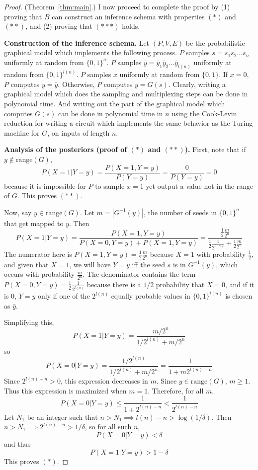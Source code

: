 \documentclass{article}
\theoremstyle{definition}
\theoremstyle{remark}
\begin{document}
\begin{proof}{(Theorem~\ref{thm:main}.)}
I now proceed to complete the proof by (1) proving that $B$ can construct an inference schema with properties $(*)$ and $(**)$, and (2) proving that $(***)$ holds.

\medskip
\noindent \textbf{Construction of the inference schema.}
Let $(P, V, E)$ be the probabilistic graphical model which implements the following process.
$P$ samples $s = s_1 s_2 \dots s_n$ uniformly at random from $\{0, 1\}^n$.
$P$ samples $\bar{y} = \bar{y}_1 \bar{y}_2 \dots \bar{y}_{l(n)}$ uniformly at random from $\{0, 1\}^{l(n)}$.
$P$ samples $x$ uniformly at random from $\{0, 1\}$.
If $x = 0$, $P$ computes $y = \bar{y}$.
Otherwise, $P$ computes $y = G(s)$.
Clearly, writing a graphical model which does the sampling and multiplexing steps can be done in polynomial time.
And writing out the part of the graphical model which computes $G(s)$ can be done in polynomial time in $n$ using the Cook-Levin reduction for writing a circuit which implements the same behavior as the Turing machine for $G$, on inputs of length $n$.

\medskip
\noindent \textbf{Analysis of the posteriors (proof of $(*)$ and $(**)$).}
First, note that if $y \notin \text{range}(G)$,
$$
P(X = 1 | Y = y) = \frac{P(X = 1, Y = y)}{P(Y = y)} = \frac{0}{P(Y = y)} = 0
$$
because it is impossible for $P$ to sample $x = 1$ yet output a value not in the range of $G$.
This proves $(**)$.

Now, say $y \in \text{range}(G)$.
Let $m = |G^{-1}(y)|$, the number of seeds in $\{0, 1\}^n$ that get mapped to $y$.
Then
$$
P(X = 1 | Y = y) = \frac{P(X = 1, Y = y)}{P(X = 0, Y = y) + P(X = 1, Y = y)}
= \frac{
    \frac{1}{2} \frac{m}{2^n}
}{
    \frac{1}{2} \frac{1}{2^{l(n)}} + \frac{1}{2} \frac{m}{2^n}
}
$$
The numerator here is $P(X = 1, Y = y) = \frac{1}{2} \frac{m}{2^n}$ 
because $X = 1$ with probability $\frac{1}{2}$, and given that $X = 1$, we will have $Y = y$ iff the seed $s$ is in $G^{-1}(y)$, which occurs with probability $\frac{m}{2^n}$.
The denominator contains the term $P(X = 0, Y = y) = \frac{1}{2} \frac{1}{2^{l(n)}}$ because there is a $1/2$ probability that $X = 0$, and if it is $0$, $Y = y$ only if one of the $2^{l(n)}$ equally probable values in $\{0, 1\}^{l(n)}$ is chosen as $\bar{y}$.

Simplifying this, 
$$
P(X = 1 | Y = y) = \frac{
    m/2^n
}{
    1/2^{l(n)} + m/2^n
}
$$
so
$$
P(X = 0 | Y = y) = \frac{
    1/2^{l(n)}
}{
    1/2^{l(n)} + m/2^n
} = \frac{1}{1 + m 2^{l(n) - n}}
$$
Since $2^{l(n) - n} > 0$, this expression decreases in $m$.
Since $y \in \text{range}(G)$, $m \geq 1$.
Thus this expression is maximized when $m = 1$.
Therefore, for all $m$,
$$
P(X = 0 | Y = y) \leq \frac{1}{1 + 2^{l(n) - n}} < \frac{1}{2^{l(n) - n}}
$$
Let $N_1$ be an integer such that
$n > N_1 \implies l(n) - n > \log(1/\delta)$.
Then $n > N_1 \implies 2^{l(n) - n} > 1/\delta$,
so for all such $n$,
$$
P(X = 0 | Y = y) < \delta
$$
and thus
$$
P(X = 1 | Y = y) > 1 - \delta
$$
This proves $(*)$.


\end{proof}
\end{document}
